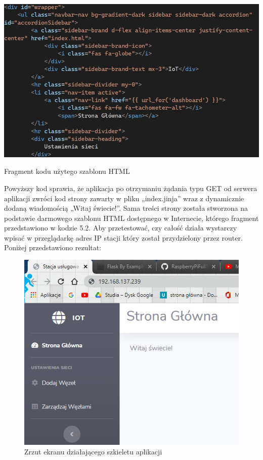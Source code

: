 \documentclass[12pt, twoside, openany]{mwrep}
\begin{document}
\begin{algorithm}[H]
\centering
\includegraphics[scale=0.7]{kod_html}
\caption{Fragment kodu użytego szablonu HTML}
\end{algorithm}

Powyższy kod sprawia, że aplikacja po otrzymaniu żądania typu GET od serwera aplikacji zwróci kod strony zawarty w pliku „index.jinja” wraz z dynamicznie dodaną wiadomością „Witaj świecie!”. Sama treści strony została stworzona na podstawie darmowego szablonu HTML dostępnego w Internecie, którego fragment przedstawiono w kodzie 5.2.  Aby przetestować, czy całość działa wystarczy wpisać w przeglądarkę adres IP stacji który został przydzielony przez router. Poniżej przedstawiono rezultat:
\begin{figure}[H]
\centering
\includegraphics[scale=0.6]{szkielet}
\caption{Zrzut ekranu działającego szkieletu aplikacji}
\end{figure}
\end{document}
